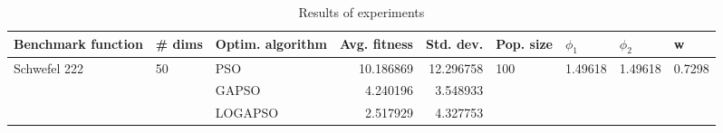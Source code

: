 \begin{table}
\centering
\caption{Results of experiments}
\begin{tabular}{lllrrllll}
\toprule
           Benchmark function &             \# dims & Optim. algorithm &  Avg. fitness &  Std. dev. &            Pop. size &               $\phi_{1}$ &               $\phi_{2}$ &                       w \\
\midrule
\multirow{3}{*}{Schwefel 222} & \multirow{3}{*}{50} &              PSO &     10.186869 &  12.296758 & \multirow{3}{*}{100} & \multirow{3}{*}{1.49618} & \multirow{3}{*}{1.49618} & \multirow{3}{*}{0.7298} \\
                              &                     &            GAPSO &      4.240196 &   3.548933 &                      &                          &                          &                         \\
                              &                     &          LOGAPSO &      2.517929 &   4.327753 &                      &                          &                          &                         \\
\bottomrule
\end{tabular}
\end{table}
